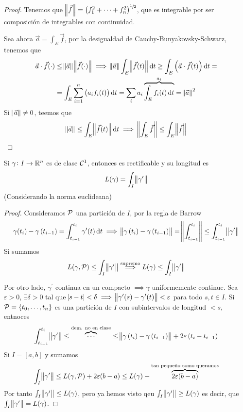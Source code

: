 \begin{proof}
    Tenemos que $\norm{\vec{f}} = \left( f^2_1 + \cdots + f^2_n \right)^{\sfrac{1}{2}}$, que es integrable por ser composición de
    integrables con continuidad.

    Sea ahora $\vec{a} = \int_E \vec{f}$, por la desigualdad de Cauchy-Bunyakovsky-Schwarz, tenemos que
    \begin{gather*}
        \vec{a} \cdot \vec{f}(\cdot) \leq \norm{\vec{a}} \norm{\vec{f}(\cdot)} \implies
        \norm{\vec{a}} \int_E \norm{\vec{f}(t)} \dif t \geq \int_E \left( \vec{a} \cdot \vec{f}(t) \right) \dif t = \\ =
        \int_E \sum^n_{i=1} \left(a_if_i(t) \right) \dif t = \sum_i a_i \overbrace{\int_E f_i(t) \dif t}^{a_i} = \norm{\vec{a}}^2
    \end{gather*}
    Si $\norm{\vec{a}} \neq 0$, teemos que
    \[
        \norm{\vec{a}} \leq \int_E \norm{\vec{f}(t)} \dif t \implies
        \norm{\int_E \vec{f}} \leq \int_E \norm{\vec{f}}
    \]
\end{proof}


\begin{prop}
    Si $\gamma \colon I \to \mathbb{R}^n$ es de clase $\mathcal{C}^1$, entonces es rectificable y su longitud es
    \[
        L(\gamma) = \int_I \norm{\gamma^\prime}
    \]
	(Considerando la norma euclideana)
\end{prop}

\begin{proof}
	Consideramos $\mathcal{P}$ una partición de $I$, por la regla de Barrow
	\[
        \gamma(t_i) - \gamma\left( t_{i-1} \right) = \int^{t_i}_{t_{i-1}} \gamma^\prime(t) \dif t \implies
        \norm{\gamma\left( t_i \right) - \gamma\left( t_{i-1} \right)} = \norm{\int^{t_i}_{t_{i-1}}} \leq \int^{t_i}_{t_{i-1}} \norm{\gamma^\prime}
	\]
    Si sumamos
    \[
        L(\gamma, \mathcal{P}) \leq \int_I \norm{\gamma^\prime} \stackrel{\text{supremo}}{\implies} L(\gamma) \leq \int_I \norm{\gamma^\prime}
    \]

    Por otro lado, $\gamma^\prime$ continua en un compacto $\implies \gamma$ uniformemente continue. Sea $\varepsilon > 0$, $\exists \delta > 0$
    tal que $\abs{s - t} < \delta \implies \norm{\gamma^\prime(s) - \gamma^\prime(t)} < \varepsilon$ para todo $s,t \in I$. Si $\mathcal{P} = \left\{t_0, \dots, t_n\right\}$
    es una partición de $I$ con subintervalos de longitud $< s$, entnoces
    \[
        \int^{t_i}_{t_{i-1}} \norm{\gamma^\prime} \leq \overbrace{\cdots}^{\text{dem. no en clase}} \leq \norm{\gamma\left( t_i \right) - \gamma\left( t_{i-1} \right)}
        + 2 \varepsilon\left( t_i - t_{i-1} \right)
    \]
    Si $I = [a, b]$ y sumamos
    \[
        \int_I \norm{\gamma^\prime} \leq L(\gamma, \mathcal{P}) + 2\varepsilon(b-a) \leq L(\gamma) + \overbrace{2\varepsilon(b-a)}^{\text{tan pequeño como queramos}}
    \]
    Por tanto $\int_I \norm{\gamma^\prime} \leq L(\gamma)$, pero ya hemos visto qeu $\int_I \norm{\gamma^\prime} \geq L(\gamma)$ es decir, que
    $\int_I \norm{\gamma^\prime} = L(\gamma)$.
\end{proof}


